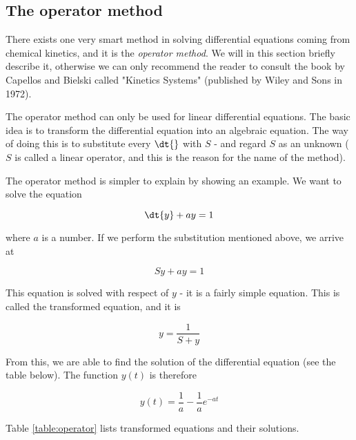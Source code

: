 \subsection{The operator method}
\label{sect:ode:operator}

There exists one very smart method in solving differential equations coming from chemical kinetics, and it is the \textit{operator method}. We will in this section briefly describe it, otherwise we can only recommend the reader to consult the book by Capellos and Bielski called "Kinetics Systems" (published by Wiley and Sons in 1972).

The operator method can only be used for linear differential equations. The basic idea is to transform the differential equation into an algebraic equation. The way of doing this is to substitute every $\dt{}$ with $S$ - and regard $S$ as an unknown ($S$ is called a linear operator, and this is the reason for the name of the method).

\begin{example}
  The operator method is simpler to explain by showing an example. We want to solve the equation

  \begin{equation}
    \dt{y} + ay = 1
  \end{equation}

  where $a$ is a number. If we perform the substitution mentioned above, we arrive at

  \begin{equation}
    Sy + ay = 1
  \end{equation}

  This equation is solved with respect of $y$ - it is a fairly simple equation. This is called the transformed equation, and it is

  \begin{equation}
    y = \frac{1}{S + y}
  \end{equation}

  From this, we are able to find the solution of the differential equation (see the table below). The function $y(t)$ is therefore

  \begin{equation}
    y(t) = \frac{1}{a} - \frac{1}{a}e^{-at}
  \end{equation}
\end{example}

Table \ref{table:operator} lists transformed equations and their solutions.

